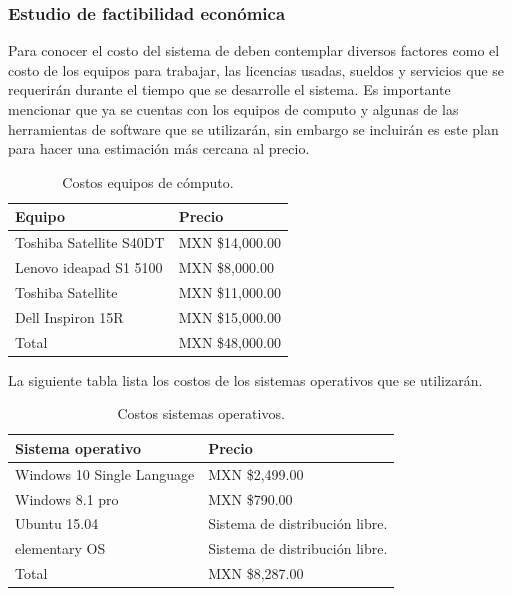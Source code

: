 \documentclass[12pt]{report}
\begin{document}
\subsubsection{Estudio de factibilidad económica}
Para conocer el costo del sistema de deben contemplar diversos factores como el costo de los equipos para trabajar, las licencias usadas, sueldos y servicios que se requerirán durante el tiempo que se desarrolle el sistema. Es importante mencionar que 
ya se cuentas con los equipos de computo y algunas de las herramientas de software que se utilizarán, sin embargo se incluirán es este plan para hacer una estimación más cercana al precio.\\
\begin{table}[H]
\begin{center}
\begin{tabular}{|p{40mm}|p{40mm}|}
\hline
Equipo & Precio \\
\hline \hline 
Toshiba Satellite S40DT & MXN \$14,000.00\\
\hline
Lenovo ideapad S1 5100 & MXN \$8,000.00\\
\hline
Toshiba Satellite & MXN \$11,000.00 \\
\hline
Dell Inspiron 15R & MXN \$15,000.00\\
\hline \hline
Total & MXN \$48,000.00\\
\hline
\end{tabular}
\caption{Costos equipos de cómputo.}
\end{center}
\end{table}

La siguiente tabla lista los costos de los sistemas operativos que se utilizarán.

\begin{table}[H]
\begin{center}
\begin{tabular}{|p{40mm}|p{40mm}|}
\hline
Sistema operativo & Precio \\
\hline \hline 
Windows 10 Single Language & MXN \$2,499.00\\
\hline
Windows 8.1 pro & MXN \$790.00\\
\hline
Ubuntu 15.04 & Sistema de distribución libre.\cite{preubu}\\
\hline
elementary OS & Sistema de distribución libre.\cite{preele}\\
\hline \hline
Total & MXN \$8,287.00\\
\hline
\end{tabular}
\caption{Costos sistemas operativos.}
\end{center}
\end{table}
\end{document}
